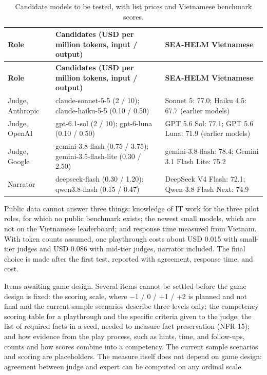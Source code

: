 {\small
\begin{longtable}{|>{\raggedright\arraybackslash}p{}|>{\raggedright\arraybackslash}p{}|>{\raggedright\arraybackslash}p{}|}
\caption{Candidate models to be tested, with list prices and Vietnamese benchmark scores.} \\
\hline
\textbf{Role} & \textbf{Candidates (USD per million tokens, input / output)} & \textbf{SEA-HELM Vietnamese} \\ \hline
\endfirsthead
\hline
\textbf{Role} & \textbf{Candidates (USD per million tokens, input / output)} & \textbf{SEA-HELM Vietnamese} \\ \hline
\endhead
Judge, Anthropic & claude-sonnet-5-5 (2 / 10); claude-haiku-5-5 (0.10 / 0.50) & Sonnet 5: 77.0; Haiku 4.5: 67.7 (earlier models) \\ \hline
Judge, OpenAI & gpt-6.1-sol (2 / 10); gpt-6-luna (0.10 / 0.50) & GPT 5.6 Sol: 77.1; GPT 5.6 Luna: 71.9 (earlier models) \\ \hline
Judge, Google & gemini-3.8-flash (0.75 / 3.75); gemini-3.5-flash-lite (0.30 / 2.50) & gemini-3.8-flash: 78.4; Gemini 3.1 Flash Lite: 75.2 \\ \hline
Narrator & deepseek-flash (0.30 / 1.20); qwen3.8-flash (0.15 / 0.47) & DeepSeek V4 Flash: 72.1; Qwen 3.8 Flash Next: 74.9 \\ \hline
\end{longtable}
}

Public data cannot answer three things: knowledge of IT work for the three pilot roles, for which no public benchmark exists; the newest small models, which are not on the Vietnamese leaderboard; and response time measured from Vietnam. With token counts assumed, one playthrough costs about USD 0.015 with small-tier judges and USD 0.086 with mid-tier judges, narrator included. The final choice is made after the first test, reported with agreement, response time, and cost.

Items awaiting game design. Several items cannot be settled before the game design is fixed: the scoring scale, where $-$1 / 0 / +1 / +2 is planned and not final and the current sample scenarios describe three levels only; the competency scoring table for a playthrough and the specific criteria given to the judge; the list of required facts in a seed, needed to measure fact preservation (NFR-15); and how evidence from the play process, such as hints, time, and follow-ups, counts and how scores combine into a competency. The current sample scenarios and scoring are placeholders. The measure itself does not depend on game design: agreement between judge and expert can be computed on any ordinal scale.

